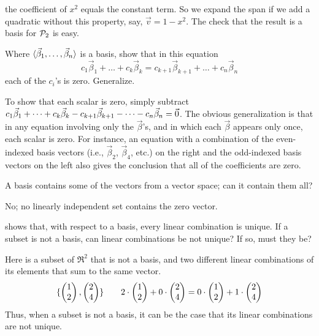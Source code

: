 \begin{exercises}
\begin{answer}
\begin{exparts}
          the coefficient of $x^2$ equals the constant term.
          So we expand the span if we add a quadratic without this property,
          say, $\vec{v}=1-x^2$.
          The check that the result is a basis for $\mathcal{P}_2$ is easy.  
      \end{exparts}
    \end{answer}
  \recommended \item  
    Where
    \( \langle\vec{\beta}_1,\dots,\vec{\beta}_n \rangle \)
    is a basis, show that in this equation
    \begin{equation*}
       c_1\vec{\beta}_1+\dots+c_k\vec{\beta}_k
       =
       c_{k+1}\vec{\beta}_{k+1}+\dots+c_n\vec{\beta}_n
    \end{equation*}
    each of the \( c_i \)'s is zero.
    Generalize.
    \begin{answer}
      To show that each scalar is zero, simply subtract
      \( c_1\vec{\beta}_1+\dots+c_k\vec{\beta}_k
          -c_{k+1}\vec{\beta}_{k+1}-\dots-c_n\vec{\beta}_n=\vec{0} \).
      The obvious generalization is that in any equation involving only the
      \( \vec{\beta} \)'s, and in which each \( \vec{\beta} \) appears only
      once, each scalar is zero.
      For instance, an equation with a combination of 
      the even-indexed basis vectors
      (i.e., $\vec{\beta}_2$, $\vec{\beta}_4$, etc.) on the right and the
      odd-indexed basis vectors on the left also gives the conclusion that
      all of the coefficients are zero. 
    \end{answer}
  \item  
    A basis contains some of the vectors from a vector space; can it 
    contain them all?
    \begin{answer}
      No; no linearly independent set contains the zero vector.
    \end{answer}
  \item  
     shows that, with respect to a
    basis, every linear combination is unique.
    If a subset is not a basis, can linear combinations be not unique?
    If so, must they be?
    \begin{answer}
      Here is a subset of $\Re^2$ that is not a basis, and two different
      linear combinations of its elements that sum to the same vector.
      \begin{equation*}
        \mbox{$\{\begin{pmatrix} 1 \\ 2 \end{pmatrix},\begin{pmatrix} 2 \\ 4 \end{pmatrix}\}$}
        \qquad
        2\cdot\begin{pmatrix} 1 \\ 2 \end{pmatrix}+0\cdot\begin{pmatrix} 2 \\ 4 \end{pmatrix}
        =0\cdot\begin{pmatrix} 1 \\ 2 \end{pmatrix}+1\cdot\begin{pmatrix} 2 \\ 4 \end{pmatrix}
      \end{equation*}
      Thus, when a subset is not a basis, it can be the case that its
      linear combinations are not unique.


\end{answer}
\end{exercises}
